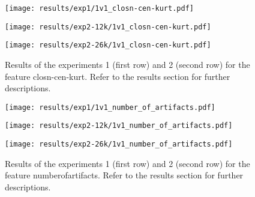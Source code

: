  
\begin{figure}[h!]
    \centering
	\begin{minipage}{0.3\linewidth}
		\texttt{[image: results/exp1/1v1\_closn-cen-kurt.pdf]}
	\end{minipage}

	\begin{minipage}{0.3\linewidth}
		\texttt{[image: results/exp2-12k/1v1\_closn-cen-kurt.pdf]}
	\end{minipage}
	\begin{minipage}{0.3\linewidth}
		\texttt{[image: results/exp2-26k/1v1\_closn-cen-kurt.pdf]}
	\end{minipage}

	\caption[ Results: Feature closn-cen-kurt]{ Results of the experiments 1 (first row) and 2 (second row) for the feature closn-cen-kurt. Refer to the results section for further descriptions. }
	\label{fig:appendix_closn-cen-kurt}
\end{figure}
 
\begin{figure}[h!]
    \centering
	\begin{minipage}{0.3\linewidth}
		\texttt{[image: results/exp1/1v1\_number\_of\_artifacts.pdf]}
	\end{minipage}

	\begin{minipage}{0.3\linewidth}
		\texttt{[image: results/exp2-12k/1v1\_number\_of\_artifacts.pdf]}
	\end{minipage}
	\begin{minipage}{0.3\linewidth}
		\texttt{[image: results/exp2-26k/1v1\_number\_of\_artifacts.pdf]}
	\end{minipage}

	\caption[ Results: Feature number\textunderscore of\textunderscore artifacts]{ Results of the experiments 1 (first row) and 2 (second row) for the feature number\textunderscore of\textunderscore artifacts. Refer to the results section for further descriptions. }
	\label{fig:appendix_number_of_artifacts}
\end{figure}
 \newpage 


